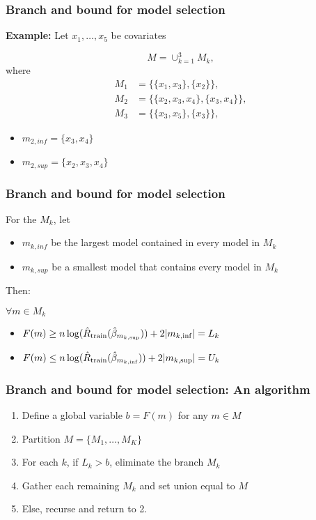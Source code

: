 \documentclass{beamer}
\begin{document}
\begin{frame}[fragile]
\frametitle{Branch and bound for model selection}
\textbf{Example:} Let $x_1, \ldots, x_5$ be covariates

\[
M  = \cup_{k=1}^3 M_k,
\]
where
\begin{align*}
M_1 
& = \{\{x_1,x_3\}, \{x_2\} \}, \\
M_2 
& = \{\{x_2,x_3,x_4\}, \{x_3,x_4\} \}, \\
 M_3 
& = \{\{x_3,x_5\}, \{x_3\} \}, 
\end{align*}
\pause

\begin{itemize}
\item[] $m_{2,inf} = \{x_3,x_4\}$
\item[] $m_{2,sup} = \{x_2,x_3,x_4\}$
\end{itemize}


\end{frame}

\begin{frame}[fragile]
\frametitle{Branch and bound for model selection}

For the $M_k$, let
\begin{itemize}
\item[] $m_{k,inf}$ be the largest model contained
 in every model in $M_k$
\item[] $m_{k,sup}$ be a smallest model that contains every model in $M_k$
\end{itemize}
\vvsp


Then:

\vsp
 $\forall m \in M_k$
\begin{itemize}
\item[] $F(m) \geq n \log(\hat{R}_{\textrm{train}}(\hat\beta_{m_{k,\sup}})) + 2|m_{k,\inf}| = L_k$  
\item[] $F(m) \leq n \log(\hat{R}_{\textrm{train}}(\hat\beta_{m_{k,\inf}})) + 2|m_{k,\sup}|  = U_k$ 

\end{itemize}

\end{frame}

\begin{frame}[fragile]
\frametitle{Branch and bound for model selection: An algorithm}
\begin{enumerate}
\item Define a global variable $b = F(m)$ for any $m \in M$

\item Partition $M = \{M_1,\ldots,M_K\}$
\item For each $k$, if $L_k > b$, eliminate the branch $M_k$
\item Gather each remaining $M_k$ and set union equal to $M$
\item Else, recurse and return to \textcolor{bluemain}{2.}
\end{enumerate}

\end{frame}
\end{document}
